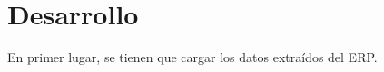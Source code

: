 \chapter{Desarrollo}\label{cap4}

En primer lugar, se tienen que cargar los datos extraídos del ERP.






